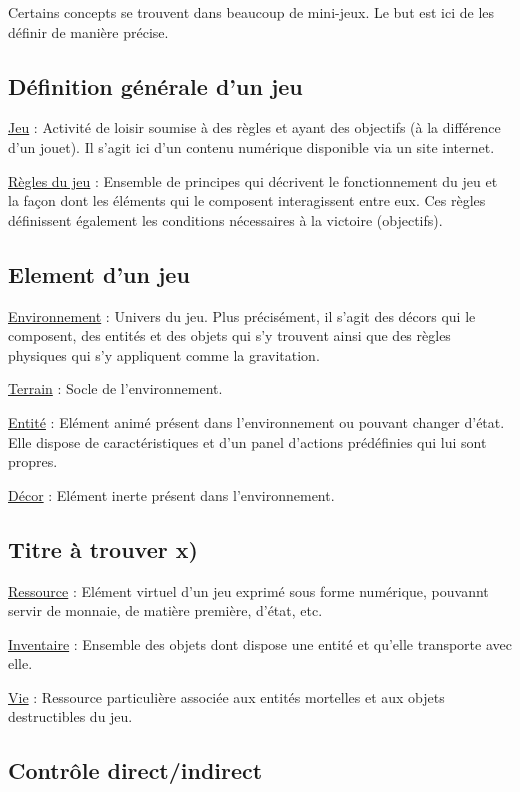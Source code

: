 Certains concepts se trouvent dans beaucoup de mini-jeux. Le but est ici de les définir de manière précise.

\subsection*{Définition générale d'un jeu}

\underline{Jeu} : 
Activité de loisir soumise à des règles et ayant des objectifs (à la différence d'un jouet). Il s'agit ici d'un contenu numérique
 disponible via un site internet.

\underline{Règles du jeu} : 
Ensemble de principes qui décrivent le fonctionnement du jeu et 
la façon dont les éléments qui le composent interagissent entre eux. 
Ces règles définissent également les conditions nécessaires à la victoire (objectifs).

\subsection*{Element d'un jeu}

\underline{Environnement} : 
Univers du jeu. 
Plus précisément, il s'agit des décors qui le composent, des entités et des objets qui s'y trouvent ainsi que 
des règles physiques qui s'y appliquent comme la gravitation.

\underline{Terrain} : 
Socle de l'environnement.

\underline{Entité} : 
Elément animé présent dans l'environnement ou pouvant changer d'état. 
Elle dispose de caractéristiques et d'un panel d'actions prédéfinies qui lui sont propres.

\underline{Décor} : 
Elément inerte présent dans l'environnement.


\subsection*{Titre à trouver x)}

\underline{Ressource} : 
Elément virtuel d'un jeu exprimé sous forme numérique, pouvannt servir de monnaie, de matière première, d'état, etc.

\underline{Inventaire} : 
Ensemble des objets dont dispose une entité et qu'elle transporte avec elle.

\underline{Vie} : 
Ressource particulière associée aux entités mortelles et aux objets destructibles du jeu.


\subsection*{Contrôle direct/indirect}

